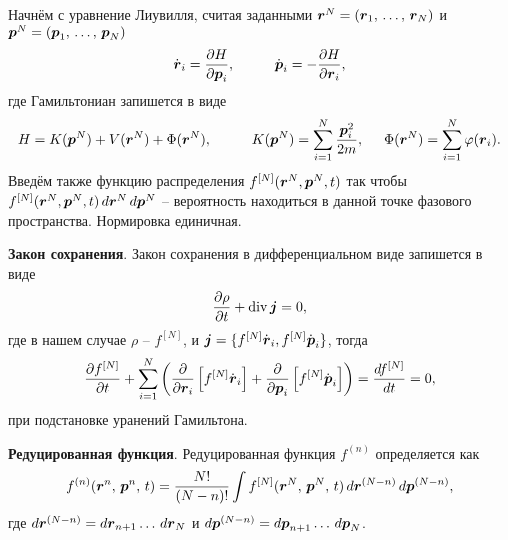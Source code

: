 

Начнём с уравнение Лиувилля, считая заданными $\boldsymbol{r}^N = (\boldsymbol{r}_1,\,  \ldots,\, \boldsymbol{r}_N)$ и $\boldsymbol{p}^N = (\boldsymbol{p}_1,\,  \ldots,\, \boldsymbol{p}_N)$
\begin{equation*}
	\dot{\vc{r}}_i = \frac{\partial H}{\partial \vc{p}_i},
	\hspace{10 mm} 
	\dot{\vc{p}}_i = -\frac{\partial H}{\partial \vc{r}_i},
\end{equation*}
где Гамильтониан запишется в виде
\begin{equation*}
	H = K(\vc{p}^N) + V(\vc{r}^N) + \Phi (\vc{r}^N),
	\hspace{10 mm} 
	K(\vc{p}^N) = \sum_{i=1}^{N} \frac{\vc{p}_i^2}{2m},
	\hspace{5 mm} 
	\Phi (\vc{r}^N) = \sum_{i=1}^{N} \varphi (\vc{r}_i).
\end{equation*}
Введём также функцию распределения $f^{[N]}(\boldsymbol{r}^N, \boldsymbol{p}^N, t)$ так чтобы $f^{[N]}(\boldsymbol{r}^N, \boldsymbol{p}^N, t) \, d \boldsymbol{r}^N \, d \boldsymbol{p}^N$ -- вероятность находиться в данной точке фазового пространства. Нормировка единичная. 

\textbf{Закон сохранения}.
Закон сохранения в дифференциальном виде запишется в виде
\begin{equation*}
	\frac{\partial \rho}{\partial t} + \mathop{\mathrm{div}}\nolimits \boldsymbol{j} = 0,
\end{equation*}
где в нашем случае $\rho$ -- $f^{[N]}$, и $\boldsymbol{j} = \{f^{[N]} \dot{\boldsymbol{r}}_i, f^{[N]} \dot{\boldsymbol{p}}_i\}$, тогда
\begin{equation*}
	\frac{\partial f^{[N]}}{\partial t} + \sum_{i=1}^{N}\left( \frac{\partial }{\partial \boldsymbol{r}_i} \left[f^{[N]} \dot{\boldsymbol{r}}_i\right] + \frac{\partial }{\partial \boldsymbol{p}_i} \left[
				f^{[N]} \dot{\boldsymbol{p}}_i
			\right]\right) = \frac{d f^{[N]}}{d t} = 0, 
\end{equation*}
при подстановке уранений Гамильтона. 



\textbf{Редуцированная функция}. Редуцированная функция $f^{(n)}$ определяется как
\begin{equation*}
	f^{(n)} (\boldsymbol{r}^n,\, \boldsymbol{p}^n,\, t) = \frac{N!}{(N-n)!} \int f^{[N]} (\boldsymbol{r}^N,\, \boldsymbol{p}^N,\, t) \, d \boldsymbol{r}^{(N-n)} \, d \boldsymbol{p}^{(N-n)},
\end{equation*}
где $d \boldsymbol{r}^{(N-n)} = d \boldsymbol{r}_{n+1} \ldots \, d \boldsymbol{r}_N$ и $d \boldsymbol{p}^{(N-n)} = d \boldsymbol{p}_{n+1} \ldots \, d \boldsymbol{p}_N$. 

